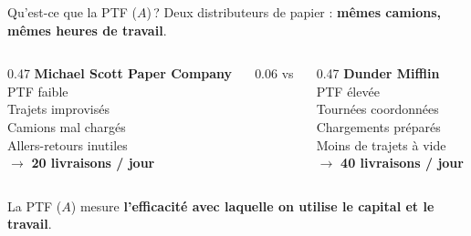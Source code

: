 \documentclass[aspectratio=169]{beamer}
\begin{document}
\begin{frame}[t]{Qu'est-ce que la PTF ($A$)\,?}
   \small
   Deux distributeurs de papier : \textbf{mêmes camions, mêmes heures de travail}.
   \vspace{0.25cm}
   \begin{columns}[T]
      \begin{column}{0.47\textwidth}
         \centering
         \textcolor{HECgray}{\textbf{Michael Scott Paper Company}}\\[5pt]
         \textcolor{HECgray}{PTF faible}\\[6pt]
         \footnotesize
         Trajets improvisés\\
         Camions mal chargés\\
         Allers-retours inutiles\\[6pt]
         $\to$ \textbf{20 livraisons / jour}
      \end{column}
      \begin{column}{0.06\textwidth}
         \centering
         \vspace{0.8cm}
         {\Large\textcolor{HECgray}{vs}}
      \end{column}
      \begin{column}{0.47\textwidth}
         \centering
         \textcolor{HECgreen}{\textbf{Dunder Mifflin}}\\[5pt]
         \textcolor{HECgreen}{PTF élevée}\\[6pt]
         \footnotesize
         Tournées coordonnées\\
         Chargements préparés\\
         Moins de trajets à vide\\[6pt]
         $\to$ \textbf{40 livraisons / jour}
      \end{column}
   \end{columns}
   \vspace{0.2cm}
   \vspace{0.15cm}
   \begin{keyinsight}
      La PTF ($A$) mesure \textbf{l'efficacité avec laquelle on utilise le capital et le travail}.
   \end{keyinsight}
\end{frame}
\end{document}

